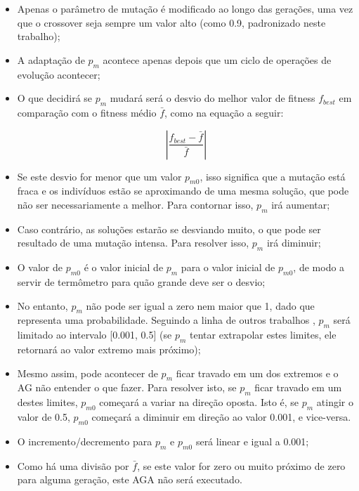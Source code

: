\begin{itemize}

	\item Apenas o parâmetro de mutação é modificado ao longo das gerações, uma vez que o crossover seja sempre um valor alto (como 0.9, padronizado neste trabalho);

	\item A adaptação de $p_m$ acontece apenas depois que um ciclo de operações de evolução acontecer;

	\item O que decidirá se $p_m$ mudará será o desvio do melhor valor de fitness $f_{best}$ em comparação com o fitness médio $\bar{f}$, como na equação a seguir:

\begin{equation}
	\left| \frac{f_{best} - \bar{f}}{\bar{f}} \right|
\label{eq:aga}
\end{equation}

	\item Se este desvio for menor que um valor $p_{m0}$, isso significa que a mutação está fraca e os indivíduos estão se aproximando de uma mesma solução, que pode não ser necessariamente a melhor. Para contornar isso, $p_m$ irá aumentar;

	\item Caso contrário, as soluções estarão se desviando muito, o que pode ser resultado de uma mutação intensa. Para resolver isso, $p_m$ irá diminuir;

	\item O valor de $p_{m0}$ é o valor inicial de $p_m$ para o valor inicial de $p_{m0}$, de modo a servir de termômetro para quão grande deve ser o desvio;

	\item No entanto, $p_m$ não pode ser igual a zero nem maior que 1, dado que representa uma probabilidade. Seguindo a linha de outros trabalhos \cite{matthias2013variable}, $p_m$ será limitado ao intervalo [0.001, 0.5] (se $p_m$ tentar extrapolar estes limites, ele retornará ao valor extremo mais próximo);
	
	\item Mesmo assim, pode acontecer de $p_m$ ficar travado em um dos extremos e o AG não entender o que fazer. Para resolver isto, se $p_m$ ficar travado em um destes limites, $p_{m0}$ começará a variar na direção oposta. Isto é, se $p_m$ atingir o valor de 0.5, $p_{m0}$ começará a diminuir em direção ao valor 0.001, e vice-versa.

	\item O incremento/decremento para $p_m$ e $p_{m0}$ será linear e igual a 0.001;
	
	\item Como há uma divisão por $\bar{f}$, se este valor for zero ou muito próximo de zero para alguma geração, este AGA não será executado.

\end{itemize}

